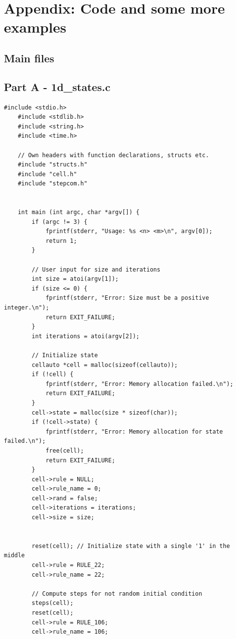 \documentclass[12pt,a4paper]{article}
\begin{document}
\section{Appendix: Code and some more examples}

\subsection{Main files}

\subsection*{\small Part A - 1d\_states.c}
\begin{lstlisting}[caption={\small 1d\_states.c},label={lst:p7001},basicstyle=\ttfamily\tiny]
    #include <stdio.h>
    #include <stdlib.h>
    #include <string.h>
    #include <time.h>

    // Own headers with function declarations, structs etc. 
    #include "structs.h"
    #include "cell.h"
    #include "stepcom.h"


    int main (int argc, char *argv[]) {
        if (argc != 3) {
            fprintf(stderr, "Usage: %s <n> <m>\n", argv[0]);
            return 1;
        }

        // User input for size and iterations
        int size = atoi(argv[1]);
        if (size <= 0) {
            fprintf(stderr, "Error: Size must be a positive integer.\n");
            return EXIT_FAILURE;
        }
        int iterations = atoi(argv[2]);

        // Initialize state
        cellauto *cell = malloc(sizeof(cellauto));
        if (!cell) {
            fprintf(stderr, "Error: Memory allocation failed.\n");
            return EXIT_FAILURE;
        }
        cell->state = malloc(size * sizeof(char));
        if (!cell->state) {
            fprintf(stderr, "Error: Memory allocation for state failed.\n");
            free(cell);
            return EXIT_FAILURE;
        }
        cell->rule = NULL; 
        cell->rule_name = 0;
        cell->rand = false;
        cell->iterations = iterations;
        cell->size = size;


        reset(cell); // Initialize state with a single '1' in the middle
        cell->rule = RULE_22;
        cell->rule_name = 22;

        // Compute steps for not random initial condition
        steps(cell);
        reset(cell); 
        cell->rule = RULE_106;
        cell->rule_name = 106;


\end{lstlisting}
\end{document}
